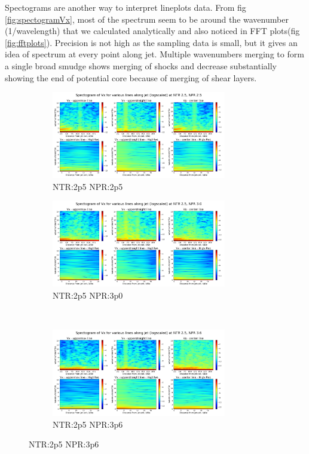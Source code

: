 Spectograms are another way to interpret lineplots data. From fig \ref{fig:spectogramVx}, most of the spectrum seem to be around the wavenumber (1/wavelength) that we calculated analytically and also noticed in FFT plots(fig \ref{fig:fftplots}). Precision is not high as the sampling data is small, but it gives an idea of spectrum at every point along jet. Multiple wavenumbers merging to form a single broad smudge shows merging of shocks and decrease substantially showing the end of potential core because of merging of shear layers. 

\begin{figure}[H]
\begin{subfigure}{0.5\textwidth}
	\centering
	\includegraphics[width=3in]{images/Spectogram_Vx_NTR2p5_NPR2p5.png}
	\caption{NTR:2p5 NPR:2p5 }
	\label{fig:spectogramVx2p52p5}
\end{subfigure}%
\begin{subfigure}{0.5\textwidth}
	\centering
	\includegraphics[width=3in]{images/Spectogram_Vx_NTR2p5_NPR3p0.png}
	\caption{NTR:2p5 NPR:3p0 }
	\label{fig:spectogramVx2p53p6}
\end{subfigure}\\
\begin{subfigure}{0.5\textwidth}
	\centering
	\includegraphics[width=3in]{images/Spectogram_Vx_NTR2p5_NPR3p6.png}
	\caption{NTR:2p5 NPR:3p6 }

\end{subfigure}
\end{figure}
